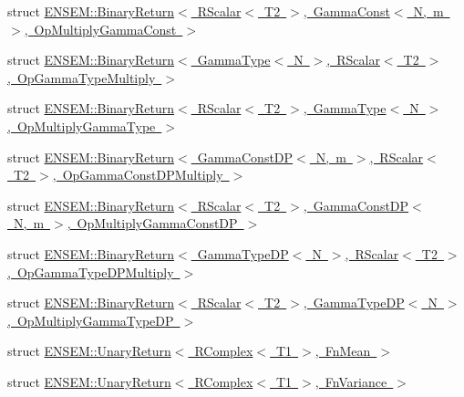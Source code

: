 \begin{DoxyCompactItemize}
\item 
struct \mbox{\hyperlink{structENSEM_1_1BinaryReturn_3_01RScalar_3_01T2_01_4_00_01GammaConst_3_01N_00_01m_01_4_00_01OpMultiplyGammaConst_01_4}{E\+N\+S\+E\+M\+::\+Binary\+Return$<$ R\+Scalar$<$ T2 $>$, Gamma\+Const$<$ N, m $>$, Op\+Multiply\+Gamma\+Const $>$}}
\item 
struct \mbox{\hyperlink{structENSEM_1_1BinaryReturn_3_01GammaType_3_01N_01_4_00_01RScalar_3_01T2_01_4_00_01OpGammaTypeMultiply_01_4}{E\+N\+S\+E\+M\+::\+Binary\+Return$<$ Gamma\+Type$<$ N $>$, R\+Scalar$<$ T2 $>$, Op\+Gamma\+Type\+Multiply $>$}}
\item 
struct \mbox{\hyperlink{structENSEM_1_1BinaryReturn_3_01RScalar_3_01T2_01_4_00_01GammaType_3_01N_01_4_00_01OpMultiplyGammaType_01_4}{E\+N\+S\+E\+M\+::\+Binary\+Return$<$ R\+Scalar$<$ T2 $>$, Gamma\+Type$<$ N $>$, Op\+Multiply\+Gamma\+Type $>$}}
\item 
struct \mbox{\hyperlink{structENSEM_1_1BinaryReturn_3_01GammaConstDP_3_01N_00_01m_01_4_00_01RScalar_3_01T2_01_4_00_01OpGammaConstDPMultiply_01_4}{E\+N\+S\+E\+M\+::\+Binary\+Return$<$ Gamma\+Const\+D\+P$<$ N, m $>$, R\+Scalar$<$ T2 $>$, Op\+Gamma\+Const\+D\+P\+Multiply $>$}}
\item 
struct \mbox{\hyperlink{structENSEM_1_1BinaryReturn_3_01RScalar_3_01T2_01_4_00_01GammaConstDP_3_01N_00_01m_01_4_00_01OpMultiplyGammaConstDP_01_4}{E\+N\+S\+E\+M\+::\+Binary\+Return$<$ R\+Scalar$<$ T2 $>$, Gamma\+Const\+D\+P$<$ N, m $>$, Op\+Multiply\+Gamma\+Const\+D\+P $>$}}
\item 
struct \mbox{\hyperlink{structENSEM_1_1BinaryReturn_3_01GammaTypeDP_3_01N_01_4_00_01RScalar_3_01T2_01_4_00_01OpGammaTypeDPMultiply_01_4}{E\+N\+S\+E\+M\+::\+Binary\+Return$<$ Gamma\+Type\+D\+P$<$ N $>$, R\+Scalar$<$ T2 $>$, Op\+Gamma\+Type\+D\+P\+Multiply $>$}}
\item 
struct \mbox{\hyperlink{structENSEM_1_1BinaryReturn_3_01RScalar_3_01T2_01_4_00_01GammaTypeDP_3_01N_01_4_00_01OpMultiplyGammaTypeDP_01_4}{E\+N\+S\+E\+M\+::\+Binary\+Return$<$ R\+Scalar$<$ T2 $>$, Gamma\+Type\+D\+P$<$ N $>$, Op\+Multiply\+Gamma\+Type\+D\+P $>$}}
\item 
struct \mbox{\hyperlink{structENSEM_1_1UnaryReturn_3_01RComplex_3_01T1_01_4_00_01FnMean_01_4}{E\+N\+S\+E\+M\+::\+Unary\+Return$<$ R\+Complex$<$ T1 $>$, Fn\+Mean $>$}}
\item 
struct \mbox{\hyperlink{structENSEM_1_1UnaryReturn_3_01RComplex_3_01T1_01_4_00_01FnVariance_01_4}{E\+N\+S\+E\+M\+::\+Unary\+Return$<$ R\+Complex$<$ T1 $>$, Fn\+Variance $>$}}
\item 

\end{DoxyCompactItemize}
